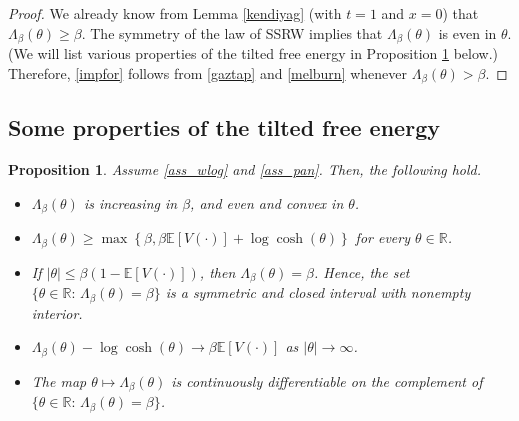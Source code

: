 \documentclass[a4paper]{amsart}
\numberwithin{equation}{section}
\theoremstyle{plain}
\newtheorem{proposition}[theorem]{\sc Proposition}
\theoremstyle{remark}
\begin{document}
\begin{proof}
	We already know from Lemma \ref{kendiyag} (with $t=1$ and $x=0$) that $\Lambda_\beta(\theta) \ge \beta$. The symmetry of the law of SSRW implies that $\Lambda_\beta(\theta)$ is even in $\theta$. (We will list various properties of the tilted free energy in Proposition \ref{temelsaf} below.) Therefore, \eqref{impfor} follows from \eqref{gaztap} and \eqref{melburn} 
	whenever $\Lambda_\beta(\theta) > \beta$.
\end{proof}

\subsection{Some properties of the tilted free energy}

\begin{proposition}\label{temelsaf}
	Assume \eqref{ass_wlog} and \eqref{ass_pan}. Then, the following hold.
	\begin{itemize}
		\item [(a)] $\Lambda_\beta(\theta)$ is increasing in $\beta$, and even and convex in $\theta$.
		\item [(b)] $\Lambda_\beta(\theta) \ge \max\left\{\beta,\beta\mathbb{E}[V(\cdot)] + \log\cosh(\theta)\right\}$ for every $\theta\in\mathbb{R}$. 
		\item [(c)] If $|\theta| \le\beta(1 - \mathbb{E}[V(\cdot)])$, then $\Lambda_\beta(\theta) = \beta$. Hence, the set $\{\theta\in\mathbb{R}:\,\Lambda_\beta(\theta) = \beta\}$ is a symmetric and closed interval with nonempty interior.
		\item [(d)] $\Lambda_\beta(\theta) - \log\cosh(\theta) \to \beta\mathbb{E}[V(\cdot)]$ as $|\theta|\to\infty$.
		\item [(e)] The map $\theta\mapsto\Lambda_\beta(\theta)$ is continuously differentiable on the complement of $\{\theta\in\mathbb{R}:\,\Lambda_\beta(\theta) = \beta\}$.
	\end{itemize}
\end{proposition}
\end{document}
